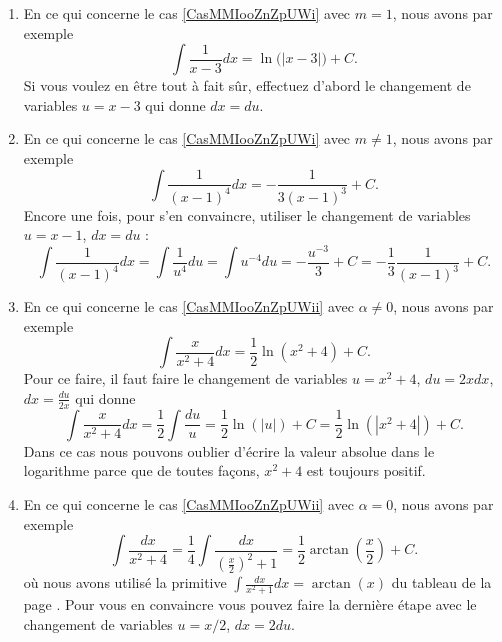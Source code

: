 \begin{enumerate}
	\item
	      En ce qui concerne le cas \eqref{CasMMIooZnZpUWi} avec \( m=1\), nous avons par exemple
	      \begin{equation}
		      \int\frac{1}{ x-3 }dx=\ln\big( | x-3 | \big)+C .
	      \end{equation}
	      Si vous voulez en être tout à fait sûr, effectuez d'abord le changement de variables \( u=x-3\) qui donne \( dx=du\).
	\item
	      En ce qui concerne le cas \eqref{CasMMIooZnZpUWi} avec \( m\neq 1\), nous avons par exemple
	      \begin{equation}
		      \int\frac{1}{ (x-1)^4 }dx=-\frac{1}{ 3(x-1)^3 }+C.
	      \end{equation}
	      Encore une fois, pour s'en convaincre, utiliser le changement de variables \( u=x-1\), \( dx=du\) :
	      \begin{equation}
		      \int\frac{1}{ (x-1)^4 }dx=\int\frac{1}{ u^4 }du=\int u^{-4}du=-\frac{ u^{-3} }{ 3 }+C=-\frac{1}{ 3 }\frac{1}{ (x-1)^3 }+C.
	      \end{equation}
	\item
	      En ce qui concerne le cas \eqref{CasMMIooZnZpUWii} avec \( \alpha\neq 0\), nous avons par exemple
	      \begin{equation}
		      \int\frac{ x }{ x^2+4 }dx=\frac{ 1 }{2}\ln(x^2+4)+C.
	      \end{equation}
	      Pour ce faire, il faut faire le changement de variables \( u=x^2+4\), \( du=2xdx\), \( dx=\frac{ du }{ 2x }\) qui donne
	      \begin{equation}
		      \int \frac{ x }{ x^2+4 }dx=\frac{ 1 }{2}\int\frac{ du }{ u }=\frac{ 1 }{2}\ln(| u |)+C=\frac{ 1 }{2}\ln(| x^2+4 |)+C.
	      \end{equation}
	      Dans ce cas nous pouvons oublier d'écrire la valeur absolue dans le logarithme parce que de toutes façons, \( x^2+4\) est toujours positif.
	\item
	      En ce qui concerne le cas \eqref{CasMMIooZnZpUWii} avec \( \alpha= 0\), nous avons par exemple
	      \begin{equation}
		      \int\frac{ dx }{ x^2+4 }=\frac{1}{ 4 }\int\frac{ dx }{ (\frac{ x }{2})^2+1 }=\frac{ 1 }{2}\arctan(\frac{ x }{2})+C.
	      \end{equation}
	      où nous avons utilisé la primitive \( \int \frac{dx}{ x^2+1 }dx=\arctan(x)\) du tableau de la page \pageref{PageLCHooMbWjOj}. Pour vous en convaincre vous pouvez faire la dernière étape avec le changement de variables \( u=x/2\), \( dx=2du\).
\end{enumerate}


